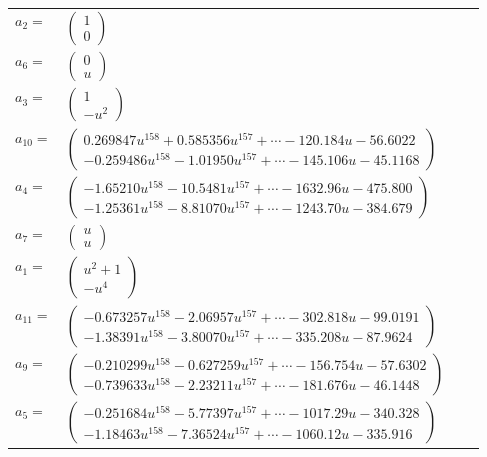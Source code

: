 \documentclass[1p]{elsarticle_modified}
\theoremstyle{definition}
\begin{document}
\begin{tabular}{m{7pt} m{180pt} m{7pt} m{180pt} }
\flushright $a_{2}=$&$\begin{pmatrix}1\\0\end{pmatrix}$ \\
\flushright $a_{6}=$&$\begin{pmatrix}0\\u\end{pmatrix}$ \\
\flushright $a_{3}=$&$\begin{pmatrix}1\\- u^2\end{pmatrix}$ \\
\flushright $a_{10}=$&$\begin{pmatrix}0.269847 u^{158}+0.585356 u^{157}+\cdots-120.184 u-56.6022\\-0.259486 u^{158}-1.01950 u^{157}+\cdots-145.106 u-45.1168\end{pmatrix}$ \\
\flushright $a_{4}=$&$\begin{pmatrix}-1.65210 u^{158}-10.5481 u^{157}+\cdots-1632.96 u-475.800\\-1.25361 u^{158}-8.81070 u^{157}+\cdots-1243.70 u-384.679\end{pmatrix}$ \\
\flushright $a_{7}=$&$\begin{pmatrix}u\\u\end{pmatrix}$ \\
\flushright $a_{1}=$&$\begin{pmatrix}u^2+1\\- u^4\end{pmatrix}$ \\
\flushright $a_{11}=$&$\begin{pmatrix}-0.673257 u^{158}-2.06957 u^{157}+\cdots-302.818 u-99.0191\\-1.38391 u^{158}-3.80070 u^{157}+\cdots-335.208 u-87.9624\end{pmatrix}$ \\
\flushright $a_{9}=$&$\begin{pmatrix}-0.210299 u^{158}-0.627259 u^{157}+\cdots-156.754 u-57.6302\\-0.739633 u^{158}-2.23211 u^{157}+\cdots-181.676 u-46.1448\end{pmatrix}$ \\
\flushright $a_{5}=$&$\begin{pmatrix}-0.251684 u^{158}-5.77397 u^{157}+\cdots-1017.29 u-340.328\\-1.18463 u^{158}-7.36524 u^{157}+\cdots-1060.12 u-335.916\end{pmatrix}$ \\

\end{tabular}
\end{document}
